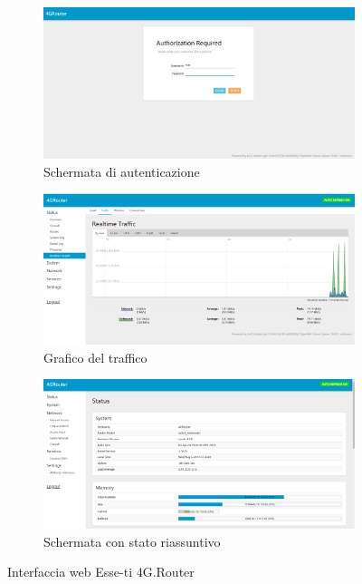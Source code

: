 \begin{figure}[H]

	\newlength{\tempheight}
	\setlength{\tempheight}{23ex}

	\centering%
	\begin{subfigure}[t]{0.5\textwidth}
		\centering%
		\includegraphics[totalheight=\tempheight]{immagini/interfacciar4g_init}
		\caption{Schermata di autenticazione}
	\end{subfigure}%
	\hfill
	\begin{subfigure}[t]{0.5\textwidth}
		\centering%
		\includegraphics[totalheight=\tempheight]{immagini/interfacciar4g_traffic}
		\caption{Grafico del traffico}
	\end{subfigure}

	\medskip

	\begin{subfigure}[b]{\textwidth}
		\centering%
		\includegraphics[totalheight=1.8\tempheight]{immagini/interfacciar4g_status}
		\caption{Schermata con stato riassuntivo}
	\end{subfigure}
	\caption{Interfaccia web Esse-ti 4G.Router}

\end{figure}

